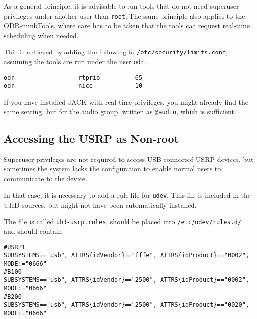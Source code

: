 As a general principle, it is advisable to run tools that do not need superuser
privileges under another user than \texttt{root}. The same principle also
applies to the ODR-mmbTools, where care has to be taken that the tools can
request real-time scheduling when needed.

This is achieved by adding the following to \texttt{/etc/security/limits.conf},
assuming the tools are run under the user \texttt{odr}.

\begin{lstlisting}
odr          -       rtprio          65
odr          -       nice           -10
\end{lstlisting}

If you have installed JACK with real-time privileges, you might already find the
same setting, but for the audio group, written as \texttt{@audio}, which is
sufficient.

\subsection{Accessing the USRP as Non-root}

Superuser privileges are not required to access USB-connected USRP devices, but
sometimes the system lacks the configuration to enable normal users to
communicate to the device.

In that case, it is necessary to add a rule file for \texttt{udev}. This file is
included in the UHD sources, but might not have been automatically installed.

The file is called \texttt{uhd-usrp.rules}, should be placed into
\texttt{/etc/udev/rules.d/} and should contain
{ \footnotesize
\begin{verbatim}
#USRP1
SUBSYSTEMS=="usb", ATTRS{idVendor}=="fffe", ATTRS{idProduct}=="0002", MODE:="0666"
#B100
SUBSYSTEMS=="usb", ATTRS{idVendor}=="2500", ATTRS{idProduct}=="0002", MODE:="0666"
#B200
SUBSYSTEMS=="usb", ATTRS{idVendor}=="2500", ATTRS{idProduct}=="0020", MODE:="0666"
\end{verbatim}
}


